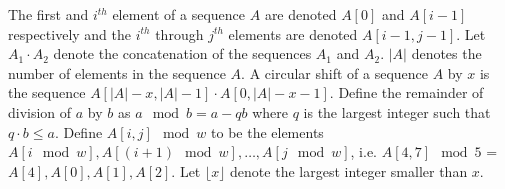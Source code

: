 The first and $i^{th}$ element of a sequence $A$ are denoted 
$A[0]$ and $A[i-1]$ respectively
and the $i^{th}$ through $j^{th}$
elements are denoted $A[i-1,j-1]$. Let $A_1 \cdot A_2$ denote the concatenation
of the sequences $A_1$ and $A_2$. $|A|$ denotes the number of elements in the
sequence $A$. A circular shift of a sequence $A$ by $x$ is the sequence
 $A[|A| - x, |A| - 1] \cdot A[0, |A| - x - 1]$. Define the remainder of division of $a$
by $b$ as $a \mod b = a - qb$ where $q$ is the largest integer such that $q \cdot b \leq a$.
Define $A[i,j] \mod w$ to be the elements $A[i \mod w], A[(i+1) \mod w], \ldots , A[j\mod w]$,
i.e. $A[4,7] \mod 5$ = $A[4],A[0],A[1],A[2]$. Let $\lfloor x \rfloor$ denote the largest integer smaller than $x$.
